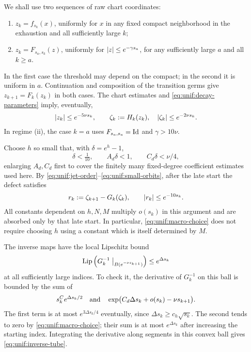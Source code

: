 We shall use two sequences of raw chart coordinates:
\begin{enumerate}[label=(\roman*)]
 \item $z_k=f_{s_k}(x)$, uniformly for $x$ in any fixed compact
 neighborhood in the exhaustion and all sufficiently large $k$;
 \item $z_k=F_{s_a,s_k}(z)$, uniformly for
 $\lvert z\rvert\le e^{-\gamma s_a}$, for any sufficiently large $a$ and
 all $k\ge a$.
\end{enumerate}
In the first case the threshold may depend on the compact; in the
second it is uniform in $a$.  Continuation and composition of the
transition germs give $z_{k+1}=F_k(z_k)$ in both cases.
The chart estimates and \eqref{eq:unif:decay-parameters} imply,
eventually,
\begin{equation}
 \lvert z_k\rvert\le e^{-5\nu s_k},\qquad
 \zeta_k:=H_k(z_k),\quad
 \lvert\zeta_k\rvert\le e^{-2\nu s_k}.
 \label{eq:unif:small-orbits}
\end{equation}
In regime (ii), the case $k=a$ uses $F_{s_a,s_a}=\operatorname{Id}$ and
$\gamma>10\nu$.

Choose $h$ so small that, with $\delta=e^h-1$,
\begin{equation}
 \delta<\tfrac1{10},\qquad
 A_d\delta<1,\qquad C_d\delta<\nu/4,
 \label{eq:unif:macro-choice}
\end{equation}
enlarging $A_d,C_d$ first to cover the finitely many fixed-degree
coefficient estimates used here.  By
\eqref{eq:unif:jet-order}--\eqref{eq:unif:small-orbits}, after the
late start the defect satisfies
\begin{equation}
 r_k:=\zeta_{k+1}-G_k(\zeta_k),\qquad
 \lvert r_k\rvert\le e^{-10s_k}.
 \label{eq:unif:orbit-defect}
\end{equation}
All constants dependent on $h,N,M$ multiply $o(s_k)$ in this argument
and are absorbed only by that late start.  In particular,
\eqref{eq:unif:macro-choice} does not require choosing $h$ using a
constant which is itself determined by $M$.

The inverse maps have the local Lipschitz bound
\begin{equation}
 \operatorname{Lip}\left(G_k^{-1}\bigm|_{B(e^{-\nu s_{k+1}})}\right)
 \le e^{\Delta s_k}
 \label{eq:unif:inverse-tube}
\end{equation}
at all sufficiently large indices.  To check it, the derivative of
$G_k^{-1}$ on this ball is bounded by the sum of
\[
 s_k^C e^{\Delta s_k/2}
 \quad\hbox{and}\quad
 \exp\bigl(C_d\Delta s_k+o(s_k)-\nu s_{k+1}\bigr).
\]
The first term is at most $e^{3\Delta s_k/4}$ eventually, since
$\Delta s_k\ge c_h\sqrt{s_k}$.  The second tends to zero by
\eqref{eq:unif:macro-choice}; their sum is at most
$e^{\Delta s_k}$ after increasing the starting index.  Integrating
the derivative along segments in this convex ball gives
\eqref{eq:unif:inverse-tube}.

